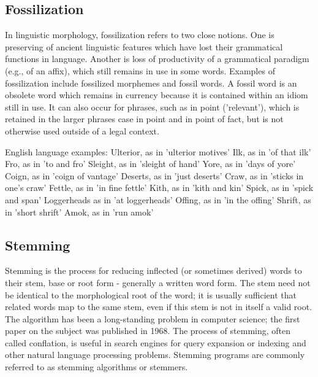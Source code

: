 \subsection{Fossilization}
In linguistic morphology, fossilization refers to two close notions. One is preserving of ancient linguistic features which have lost their grammatical functions in language. Another is loss of productivity of a grammatical paradigm (e.g., of an affix), which still remains in use in some words.
Examples of fossilization include fossilized morphemes and fossil words.  A fossil word is an obsolete word which remains in currency because it is contained within an idiom still in use.  It can also occur for phrases, such as in point ('relevant'), which is retained in the larger phrases case in point and in point of fact, but is not otherwise used outside of a legal context.

\begin{center}
English language examples:
Ulterior, as in 'ulterior motives'
Ilk, as in 'of that ilk'
Fro, as in 'to and fro'
Sleight, as in 'sleight of hand'
Yore, as in 'days of yore'
Coign, as in 'coign of vantage'
Deserts, as in 'just deserts'
Craw, as in 'sticks in one's craw'
Fettle, as in 'in fine fettle'
Kith, as in 'kith and kin'
Spick, as in 'spick and span'
Loggerheads as in 'at loggerheads'
Offing, as in 'in the offing'
Shrift, as in 'short shrift'
Amok, as in 'run amok'
\end{center}

\subsection{Stemming}
Stemming is the process for reducing inflected (or sometimes derived) words to their stem, base or root form - generally a written word form. The stem need not be identical to the morphological root of the word; it is usually sufficient that related words map to the same stem, even if this stem is not in itself a valid root. The algorithm has been a long-standing problem in computer science; the first paper on the subject was published in 1968. The process of stemming, often called conflation, is useful in search engines for query expansion or indexing and other natural language processing problems.  Stemming programs are commonly referred to as stemming algorithms or stemmers.


